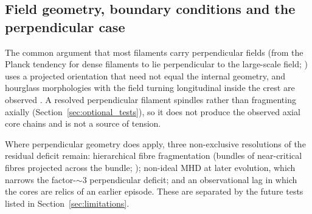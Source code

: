 \documentclass[usenatbib,twoside,twocolumn]{mnras}
\begin{document}
\subsection{Field geometry, boundary conditions and the perpendicular case}
\label{sec:why_mhd_fails}

The common argument that most filaments carry perpendicular fields (from the Planck tendency for dense filaments to lie perpendicular to the large-scale field; \citealt{Planck2016}) uses a projected orientation that need not equal the internal geometry, and hourglass morphologies with the field turning longitudinal inside the crest are observed \citep{Jadhav2026}. A resolved perpendicular filament spindles rather than fragmenting axially (Section~\ref{sec:optional_tests}), so it does not produce the observed axial core chains and is not a source of tension.

Where perpendicular geometry does apply, three non-exclusive resolutions of the residual deficit remain: hierarchical fibre fragmentation (bundles of near-critical fibres projected across the bundle; \citealt{Hacar2013,Hacar2018,Yang2024}); non-ideal MHD at later evolution, which narrows the factor-$\sim3$ perpendicular deficit; and an observational lag in which the cores are relics of an earlier episode. These are separated by the future tests listed in Section~\ref{sec:limitations}.
\end{document}
